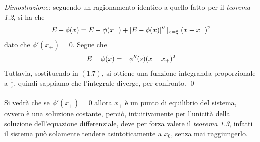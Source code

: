 \documentclass{article}
\begin{document}
\textit{Dimostrazione:} seguendo un ragionamento identico a quello fatto per il \textit{teorema 1.2}, si ha che
\begin{equation}
    E - \phi(x) = E - \phi(x_+) + [E - \phi(x)]''\left|_{x = \xi}\right. (x - x_+)^2 \notag
\end{equation}
dato che $\phi'(x_+) = 0$. Segue che
\begin{equation}
    E - \phi(x) = -\phi''(s) (x - x_+)^2 \notag
\end{equation}
Tuttavia, sostituendo in $(1.7)$, si ottiene una funzione integranda proporzionale a $\frac{1}{x}$, quindi sappiamo che l'integrale diverge, per confronto. \qed \\ \\
Si vedrà che se $\phi'(x_+) = 0$ allora $x_+$ è un punto di equilibrio del sistema, ovvero è una soluzione costante, perciò, intuitivamente per l'unicità della soluzione dell'equazione differenziale, deve per forza valere il \textit{teorema 1.3}, infatti il sistema può solamente tendere asintoticamente a $x_0$, senza mai raggiungerlo.

\newpage
\end{document}
